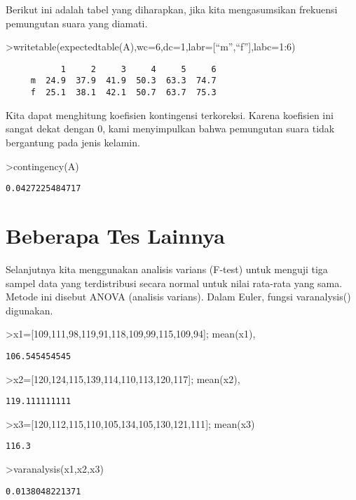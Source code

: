 \documentclass[
]{book}
\begin{document}
Berikut ini adalah tabel yang diharapkan, jika kita mengasumsikan frekuensi pemungutan suara yang diamati.

\textgreater writetable(expectedtable(A),wc=6,dc=1,labr={[}``m'',``f''{]},labc=1:6)

\begin{verbatim}
           1     2     3     4     5     6
     m  24.9  37.9  41.9  50.3  63.3  74.7
     f  25.1  38.1  42.1  50.7  63.7  75.3
\end{verbatim}

Kita dapat menghitung koefisien kontingensi terkoreksi. Karena koefisien ini sangat dekat dengan 0, kami menyimpulkan bahwa pemungutan suara tidak bergantung pada jenis kelamin.

\textgreater contingency(A)

\begin{verbatim}
0.0427225484717
\end{verbatim}

\chapter{Beberapa Tes Lainnya}\label{beberapa-tes-lainnya}

Selanjutnya kita menggunakan analisis varians (F-test) untuk menguji tiga sampel data yang terdistribusi secara normal untuk nilai rata-rata yang sama. Metode ini disebut ANOVA (analisis varians). Dalam Euler, fungsi varanalysis() digunakan.

\textgreater x1={[}109,111,98,119,91,118,109,99,115,109,94{]}; mean(x1),

\begin{verbatim}
106.545454545
\end{verbatim}

\textgreater x2={[}120,124,115,139,114,110,113,120,117{]}; mean(x2),

\begin{verbatim}
119.111111111
\end{verbatim}

\textgreater x3={[}120,112,115,110,105,134,105,130,121,111{]}; mean(x3)

\begin{verbatim}
116.3
\end{verbatim}

\textgreater varanalysis(x1,x2,x3)

\begin{verbatim}
0.0138048221371
\end{verbatim}
\end{document}
